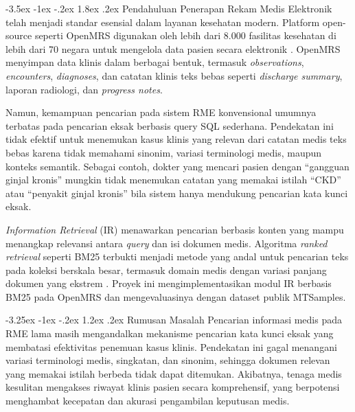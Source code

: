 \documentclass[a4paper,12pt]{article}
\makeatletter
\renewcommand{\section}{\@startsection{section}{1}{\z@}%
  {-3.5ex \@plus -1ex \@minus -.2ex}%
  {1.8ex \@plus .2ex}%
  {\normalfont\normalsize\bfseries}}
\renewcommand{\subsection}{\@startsection{subsection}{2}{\z@}%
  {-3.25ex \@plus -1ex \@minus -.2ex}%
  {1.2ex \@plus .2ex}%
  {\normalfont\normalsize\bfseries}}
\makeatother
\begin{document}
\section{Pendahuluan}
Penerapan Rekam Medis Elektronik telah menjadi standar esensial dalam layanan kesehatan modern. Platform open-source seperti OpenMRS digunakan oleh lebih dari 8.000 fasilitas kesehatan di lebih dari 70 negara untuk mengelola data pasien secara elektronik \citep{syzdykova2017open}. OpenMRS menyimpan data klinis dalam berbagai bentuk, termasuk \textit{observations}, \textit{encounters}, \textit{diagnoses}, dan catatan klinis teks bebas seperti \textit{discharge summary}, laporan radiologi, dan \textit{progress notes}.

Namun, kemampuan pencarian pada sistem RME konvensional umumnya terbatas pada pencarian eksak berbasis query SQL sederhana. Pendekatan ini tidak efektif untuk menemukan kasus klinis yang relevan dari catatan medis teks bebas karena tidak memahami sinonim, variasi terminologi medis, maupun konteks semantik. Sebagai contoh, dokter yang mencari pasien dengan ``gangguan ginjal kronis'' mungkin tidak menemukan catatan yang memakai istilah ``CKD'' atau ``penyakit ginjal kronis'' bila sistem hanya mendukung pencarian kata kunci eksak.

\textit{Information Retrieval} (IR) menawarkan pencarian berbasis konten yang mampu menangkap relevansi antara \textit{query} dan isi dokumen medis. Algoritma \textit{ranked retrieval} seperti BM25 terbukti menjadi metode yang andal untuk pencarian teks pada koleksi berskala besar, termasuk domain medis dengan variasi panjang dokumen yang ekstrem \citep{robertson2009bm25}. Proyek ini mengimplementasikan modul IR berbasis BM25 pada OpenMRS dan mengevaluasinya dengan dataset publik MTSamples.

\subsection{Rumusan Masalah}
Pencarian informasi medis pada RME lama masih mengandalkan mekanisme pencarian kata kunci eksak yang membatasi efektivitas penemuan kasus klinis. Pendekatan ini gagal menangani variasi terminologi medis, singkatan, dan sinonim, sehingga dokumen relevan yang memakai istilah berbeda tidak dapat ditemukan. Akibatnya, tenaga medis kesulitan mengakses riwayat klinis pasien secara komprehensif, yang berpotensi menghambat kecepatan dan akurasi pengambilan keputusan medis.
\end{document}

